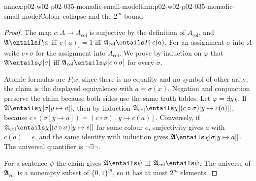 \begin{annexitem}{annex:p02-w02-p02-035-monadic-small-model}{thm:p02-w02-p02-035-monadic-small-model}{Colour collapse and the \(2^m\) bound}
\begin{proof}
The map \(c:A\to A_{\mathrm{col}}\) is surjective by the definition of
\(A_{\mathrm{col}}\), and \(\mathfrak A\entails P_ia\) iff \(c(a)_i=1\) iff
\(\mathfrak A_{\mathrm{col}}\entails P_i\,c(a)\).  For an assignment \(\sigma\)
into \(A\) write \(c\circ\sigma\) for the assignment into
\(A_{\mathrm{col}}\).  We prove by induction on \(\varphi\) that
\(\mathfrak A\entails\varphi[\sigma]\) iff
\(\mathfrak A_{\mathrm{col}}\entails\varphi[c\circ\sigma]\) for every
\(\sigma\).

Atomic formulas are \(P_ix\), since there is no equality and no symbol of
other arity; the claim is the displayed equivalence with \(a=\sigma(x)\).
Negation and conjunction preserve the claim because both sides use the same
truth tables.  Let \(\varphi=\exists y\chi\).  If
\(\mathfrak A\entails\chi[\sigma[y\mapsto a]]\), then by induction
\(\mathfrak A_{\mathrm{col}}\entails\chi[(c\circ\sigma)[y\mapsto c(a)]]\),
because \(c\circ(\sigma[y\mapsto a])=(c\circ\sigma)[y\mapsto c(a)]\).
Conversely, if \(\mathfrak A_{\mathrm{col}}\entails
\chi[(c\circ\sigma)[y\mapsto e]]\) for some colour \(e\), surjectivity gives
\(a\) with \(c(a)=e\), and the same identity with induction gives
\(\mathfrak A\entails\chi[\sigma[y\mapsto a]]\).  The universal quantifier is
\(\neg\exists\neg\).

For a sentence \(\psi\) the claim gives \(\mathfrak A\entails\psi\) iff
\(\mathfrak A_{\mathrm{col}}\entails\psi\).  The universe of
\(\mathfrak A_{\mathrm{col}}\) is a nonempty subset of \(\{0,1\}^m\), so it has
at most \(2^m\) elements.
\end{proof}
\end{annexitem}

